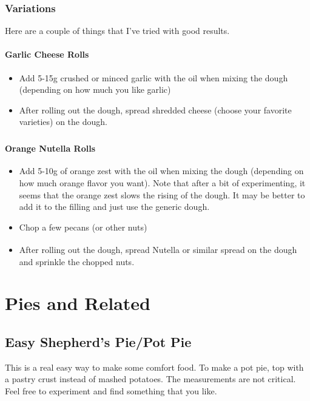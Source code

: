 \documentclass[10pt, openany]{book}
\begin{document}
\subsection{Variations}
Here are a couple of things that I've tried with good results.
\subsubsection{Garlic Cheese Rolls}
\begin{itemize}
  \item Add 5-15g crushed or minced garlic with the oil when mixing the dough (depending on how much you like garlic)
  \item After rolling out the dough, spread shredded cheese (choose your favorite varieties) on the dough.
\end{itemize}
\subsubsection{Orange Nutella\textsuperscript{\textregistered} Rolls}
\begin{itemize}
  \item Add 5-10g of orange zest with the oil when mixing the dough (depending on how much orange flavor you want).  Note that after a bit of experimenting, it seems that the orange zest slows the rising of the dough.  It may be better to add it to the filling and just use the generic dough.
  \item Chop a few pecans (or other nuts)
  \item After rolling out the dough, spread Nutella\textsuperscript{\textregistered} or similar spread on the dough and sprinkle the chopped nuts.
\end{itemize}

\chapter{Pies and Related}
\section{Easy Shepherd's Pie/Pot Pie}
\label{pie:ShepherdsPie}
This is a real easy way to make some comfort food.  To make a pot pie, top with a pastry crust instead of mashed potatoes.  The measurements are not critical.  Feel free to experiment and find something that you like.
\end{document}
